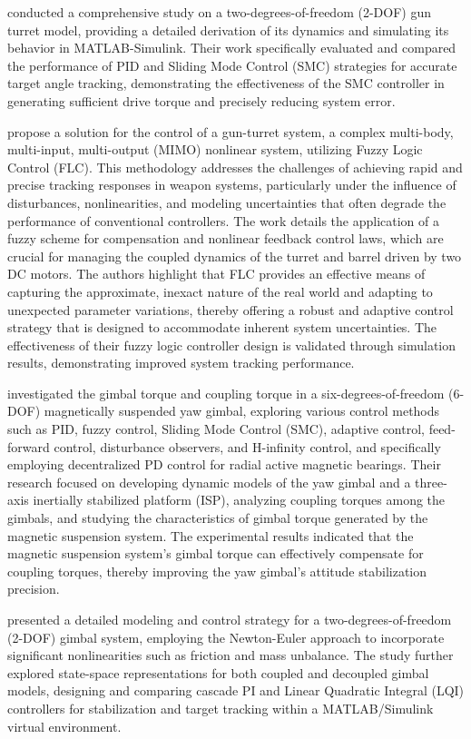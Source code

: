  conducted a comprehensive study on a two-degrees-of-freedom (2-DOF) gun turret model, providing a detailed derivation of its dynamics and simulating its behavior in MATLAB-Simulink. Their work specifically evaluated and compared the performance of PID and Sliding Mode Control (SMC) strategies for accurate target angle tracking, demonstrating the effectiveness of the SMC controller in generating sufficient drive torque and precisely reducing system error.

 propose a solution for the control of a gun-turret system, a complex multi-body, multi-input, multi-output (MIMO) nonlinear system, utilizing Fuzzy Logic Control (FLC). This methodology addresses the challenges of achieving rapid and precise tracking responses in weapon systems, particularly under the influence of disturbances, nonlinearities, and modeling uncertainties that often degrade the performance of conventional controllers. The work details the application of a fuzzy scheme for compensation and nonlinear feedback control laws, which are crucial for managing the coupled dynamics of the turret and barrel driven by two DC motors. The authors highlight that FLC provides an effective means of capturing the approximate, inexact nature of the real world and adapting to unexpected parameter variations, thereby offering a robust and adaptive control strategy that is designed to accommodate inherent system uncertainties. The effectiveness of their fuzzy logic controller design is validated through simulation results, demonstrating improved system tracking performance.

 investigated the gimbal torque and coupling torque in a six-degrees-of-freedom (6-DOF) magnetically suspended yaw gimbal, exploring various control methods such as PID, fuzzy control, Sliding Mode Control (SMC), adaptive control, feed-forward control, disturbance observers, and H-infinity control, and specifically employing decentralized PD control for radial active magnetic bearings. Their research focused on developing dynamic models of the yaw gimbal and a three-axis inertially stabilized platform (ISP), analyzing coupling torques among the gimbals, and studying the characteristics of gimbal torque generated by the magnetic suspension system. The experimental results indicated that the magnetic suspension system's gimbal torque can effectively compensate for coupling torques, thereby improving the yaw gimbal's attitude stabilization precision.

 presented a detailed modeling and control strategy for a two-degrees-of-freedom (2-DOF) gimbal system, employing the Newton-Euler approach to incorporate significant nonlinearities such as friction and mass unbalance. The study further explored state-space representations for both coupled and decoupled gimbal models, designing and comparing cascade PI and Linear Quadratic Integral (LQI) controllers for stabilization and target tracking within a MATLAB/Simulink virtual environment.

